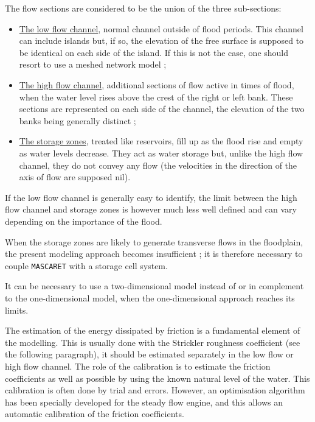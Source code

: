 The flow sections are considered to be the union of the three sub-sections:
\begin{itemize}
 \item \underline{The low flow channel}, normal channel outside of flood periods. This channel can include islands but, if so, the elevation of the free surface is supposed to be identical on each side of the island. If this is not the case, one should resort to use a meshed network model ;
 \item \underline{The high flow channel}, additional sections of flow active in times of flood, when the water level rises above the crest of the right or left bank. These sections are represented on each side of the channel, the elevation of the two banks being generally distinct ;
 \item \underline{The storage zones}, treated like reservoirs, fill up as the flood rise and empty as water levels decrease. They act as water storage but, unlike the high flow channel, they do not convey any flow (the velocities in the direction of the axis of flow are supposed nil).
\end{itemize}

\vspace{0.5cm}

If the low flow channel is generally easy to identify, the limit between the high flow channel and storage zones is however much less well defined and can vary depending on the importance of the flood.

\vspace{0.5cm}

When the storage zones are likely to generate transverse flows in the floodplain, the present modeling approach becomes insufficient ; it is therefore necessary to couple \texttt{MASCARET} with a storage cell system.

\vspace{0.5cm}

It can be necessary to use a two-dimensional model instead of or in complement to the one-dimensional model, when the one-dimensional approach reaches its limits.

\vspace{0.5cm}

The estimation of the energy dissipated by friction is a fundamental element of the modelling. This is usually done with the Strickler roughness coefficient (see the following paragraph), it should be estimated separately in the low flow or high flow channel. The role of the calibration is to estimate the friction coefficients as well as possible by using the known natural level of the water. This calibration is often done by trial and errors. However, an optimisation algorithm has been specially developed for the steady flow engine, and this allows an automatic calibration of the friction coefficients.

